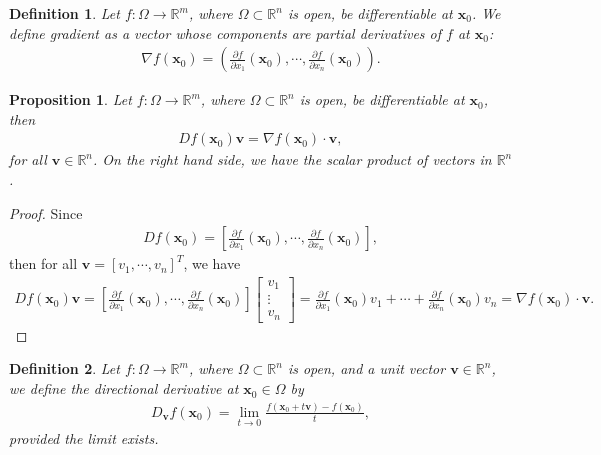\documentclass[11pt]{book}
\newtheorem{definition}{Definition}[chapter]
\newtheorem{proposition}{Proposition}[chapter]
\theoremstyle{definition}
\numberwithin{equation}{chapter}
\begin{document}
\medskip

\begin{definition}
Let $f: \Omega \to \mathbb{R}^m$, where $\Omega \subset \mathbb{R}^n$ is open, be differentiable at $\mathbf{x}_0$. We define gradient as a vector whose components are partial derivatives of $f$ at $\mathbf{x}_0$:
\begin{align*}
    \nabla f(\mathbf{x}_0) = \left(\frac{\partial f}{\partial x_1}(\mathbf{x}_0), \cdots, \frac{\partial f}{\partial x_n}(\mathbf{x}_0)\right).
\end{align*}
\end{definition}

\medskip

\begin{proposition}
Let $f: \Omega \to \mathbb{R}^m$, where $\Omega \subset \mathbb{R}^n$ is open, be differentiable at $\mathbf{x}_0$, then
\begin{align*}
    Df(\mathbf{x}_0) \mathbf{v} = \nabla f(\mathbf{x}_0) \cdot \mathbf{v},
\end{align*}
for all $\mathbf{v} \in \mathbb{R}^n$. On the right hand side, we have the scalar product of vectors in $\mathbb{R}^n$.
\end{proposition}
\begin{proof}
Since
\begin{align*}
    Df(\mathbf{x}_0) = \left[\frac{\partial f}{\partial x_1}(\mathbf{x}_0), \cdots, \frac{\partial f}{\partial x_n}(\mathbf{x}_0)\right],
\end{align*}
then for all $\mathbf{v} = \left[v_1, \cdots, v_n\right]^T$, we have
\begin{align*}
    Df(\mathbf{x}_0) \mathbf{v} = \left[\frac{\partial f}{\partial x_1}(\mathbf{x}_0), \cdots, \frac{\partial f}{\partial x_n}(\mathbf{x}_0)\right] 
    \begin{bmatrix}
        v_1 \\
        \vdots \\
        v_n
    \end{bmatrix} = \frac{\partial f}{\partial x_1}(\mathbf{x}_0) v_1 + \cdots + \frac{\partial f}{\partial x_n}(\mathbf{x}_0) v_n = \nabla f(\mathbf{x}_0) \cdot \mathbf{v}.
\end{align*}
\end{proof}

\medskip

\begin{definition}
Let $f: \Omega \to \mathbb{R}^m$, where $\Omega \subset \mathbb{R}^n$ is open, and a unit vector $\mathbf{v} \in \mathbb{R}^n$, we define the directional derivative at $\mathbf{x}_0 \in \Omega$ by
\begin{align*}
    D_{\mathbf{v}} f(\mathbf{x}_0) = \lim_{t \to 0} \frac{f(\mathbf{x}_0 + t \mathbf{v}) - f(\mathbf{x}_0)}{t}, 
\end{align*}
provided the limit exists.
\end{definition}
\end{document}

